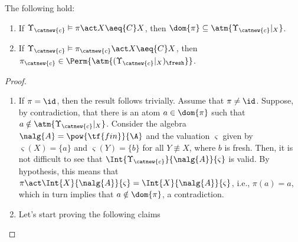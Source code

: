 \begin{lemma} \label{alemma:valid-fix-point-judgment}
The following hold:
\begin{enumerate}
     \item \label{alemma:domain-preservation} If $\Upsilon_{\catnew{c}} \vDash \pi\act X \aeq{C} X$, then $\dom{\pi}\subseteq \atm{\Upsilon_{\catnew{c}}|_X}$.
     \item \label{alemma:valid-pi-c-in-generated} If $\Upsilon_{\catnew{c}} \vDash \pi_{\catnew{c}}\act X \aeq{C} X$, then $\pi_{\catnew{c}}\in \Perm{\atm{(\Upsilon_{\catnew{c}}|_X)_{\fresh}}}$.
\end{enumerate}
\end{lemma}

\begin{proof}
     \begin{enumerate}
         \item If $\pi = \id$, then the result follows trivially. Assume that $\pi\neq \id$. Suppose, by contradiction, that there is an atom $a\in \dom{\pi}$ such that $a\notin\atm{\Upsilon_{\catnew{c}}|_X}$. Consider the algebra $\nalg{A} = \pow{\tf{fin}}{\A}$ and the valuation $\varsigma$ given by $\varsigma(X) = \{a\}$ and $\varsigma(Y) = \{b\}$ for all $Y\not\equiv X$, where $b$ is fresh. Then, it is not difficult to see that $\Int{\Upsilon_{\catnew{c}}}{\nalg{A}}{\varsigma}$ is valid. By hypothesis, this means that $\pi\act \Int{X}{\nalg{A}}{\varsigma} = \Int{X}{\nalg{A}}{\varsigma}$, i.e., $\pi(a) = a$, which in turn implies that $a\notin \dom{\pi}$, a contradiction.

        \item Let's start proving the following claims


\end{enumerate}
\end{proof}
